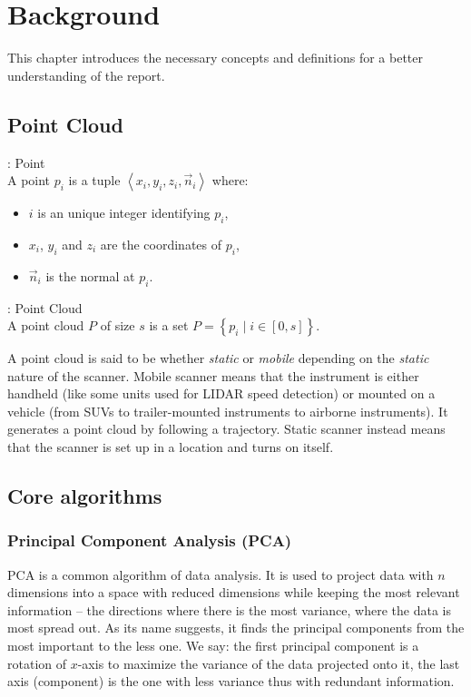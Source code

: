 \chapter{Background}
\label{ch:background}
This chapter introduces the necessary concepts and definitions for a better understanding of the report.

\section{Point Cloud}
\label{sc:back-point-cloud}
\begin{definition}{: Point}
  \\A point $p_i$ is a tuple $\left\langle x_i, y_i, z_i, \vec{n}_i \right\rangle$ where:
  \begin{itemize}
    \item $i$ is an unique integer identifying $p_i$,
    \item $x_i$, $y_i$ and $z_i$ are the coordinates of $p_i$,
    \item $\vec{n}_i$ is the normal at $p_i$.
  \end{itemize}
\end{definition}

\begin{definition}{: Point Cloud}
  \\A point cloud $P$ of size $s$ is a set $P = \left\lbrace p_i \mid i \in [0, s]  \right\rbrace$.
\end{definition}

A point cloud is said to be whether \emph{static} or \emph{mobile} depending on the \emph{static} nature of the scanner. Mobile scanner means that the instrument is either handheld (like some units used for LIDAR speed detection) or mounted on a vehicle (from SUVs to trailer-mounted instruments to airborne instruments). It generates a point cloud by following a trajectory. Static scanner instead means that the scanner is set up in a location and turns on itself.


\section{Core algorithms}

\subsection{Principal Component Analysis (PCA)}
\label{subsc:pca}
PCA is a common algorithm of data analysis. It is used to project data with $n$ dimensions into a space with reduced dimensions while keeping the most relevant information -- the directions where there is the most variance, where the data is most spread out. As its name suggests, it finds the principal components from the most important to the less one. We say: the first principal component is a rotation of $x$-axis to maximize the variance of the data projected onto it, the last axis
(component) is the one with less variance thus with redundant information.

